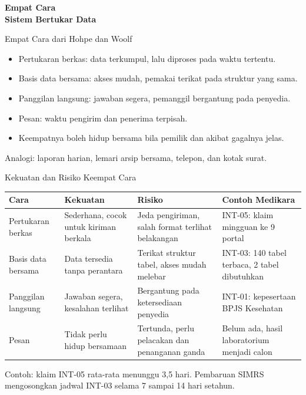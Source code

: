 \documentclass[aspectratio=169, table, 12pt]{beamer}
\begin{document}
\begin{frame}{\hfill}
  \centering
  \Huge{\textbf{Empat Cara\\Sistem Bertukar Data}}
\end{frame}

\begin{frame}{{\Large Empat Cara dari Hohpe dan Woolf}}
  \vspace{10pt}
  \begin{itemize}
    \item Pertukaran berkas: data terkumpul, lalu diproses pada waktu tertentu.
    \item Basis data bersama: akses mudah, pemakai terikat pada struktur yang sama.
    \item Panggilan langsung: jawaban segera, pemanggil bergantung pada penyedia.
    \item Pesan: waktu pengirim dan penerima terpisah.
    \item Keempatnya boleh hidup bersama bila pemilik dan akibat gagalnya jelas.
  \end{itemize}
  \vspace{6pt}
  {\small Analogi: laporan harian, lemari arsip bersama, telepon, dan kotak surat.}
\end{frame}

\begin{frame}{{\Large Kekuatan dan Risiko Keempat Cara}}
  \footnotesize
  \begin{tabularx}{\textwidth}{>{\raggedright\arraybackslash}p{2.6cm}
      >{\raggedright\arraybackslash}X >{\raggedright\arraybackslash}X >{\raggedright\arraybackslash}p{3.3cm}}
    \hline
    \textbf{Cara} & \textbf{Kekuatan} & \textbf{Risiko} & \textbf{Contoh Medikara} \\ \hline
    Pertukaran berkas & Sederhana, cocok untuk kiriman berkala & Jeda pengiriman, salah format terlihat belakangan & INT-05: klaim mingguan ke 9 portal \\ \hline
    Basis data bersama & Data tersedia tanpa perantara & Terikat struktur tabel, akses mudah melebar & INT-03: 140 tabel terbaca, 2 tabel dibutuhkan \\ \hline
    Panggilan langsung & Jawaban segera, kesalahan terlihat & Bergantung pada ketersediaan penyedia & INT-01: kepesertaan BPJS Kesehatan \\ \hline
    Pesan & Tidak perlu hidup bersamaan & Tertunda, perlu pelacakan dan penanganan ganda & Belum ada, hasil laboratorium menjadi calon \\ \hline
  \end{tabularx}

  \vspace{6pt}
  Contoh: klaim INT-05 rata-rata menunggu 3,5 hari. Pembaruan SIMRS mengosongkan jadwal INT-03 selama 7 sampai 14 hari setahun.
\end{frame}
\end{document}
